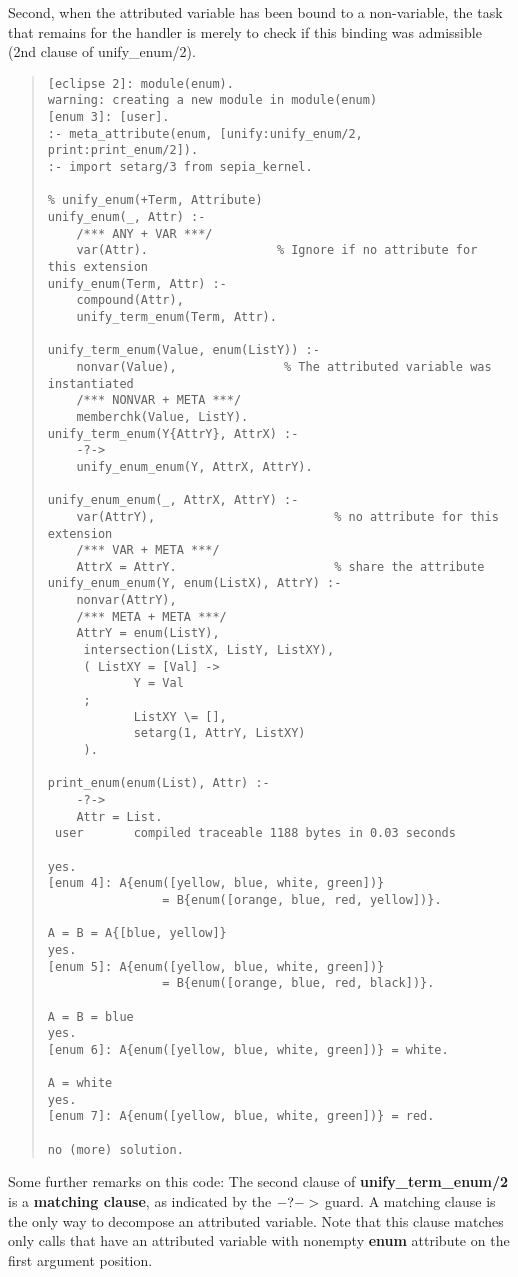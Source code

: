 Second, when the attributed variable has been bound to a non-variable, the
task that remains for the handler is merely to check if this binding
was admissible (2nd clause of unify_enum/2).

\begin{quote}\begin{verbatim}
[eclipse 2]: module(enum).
warning: creating a new module in module(enum)
[enum 3]: [user].
:- meta_attribute(enum, [unify:unify_enum/2, print:print_enum/2]).
:- import setarg/3 from sepia_kernel.

% unify_enum(+Term, Attribute)
unify_enum(_, Attr) :-
    /*** ANY + VAR ***/
    var(Attr).                  % Ignore if no attribute for this extension
unify_enum(Term, Attr) :-
    compound(Attr),
    unify_term_enum(Term, Attr).

unify_term_enum(Value, enum(ListY)) :-
    nonvar(Value),               % The attributed variable was instantiated
    /*** NONVAR + META ***/
    memberchk(Value, ListY).
unify_term_enum(Y{AttrY}, AttrX) :-
    -?->
    unify_enum_enum(Y, AttrX, AttrY).

unify_enum_enum(_, AttrX, AttrY) :-
    var(AttrY),                         % no attribute for this extension
    /*** VAR + META ***/
    AttrX = AttrY.                      % share the attribute
unify_enum_enum(Y, enum(ListX), AttrY) :-
    nonvar(AttrY),
    /*** META + META ***/
    AttrY = enum(ListY),
     intersection(ListX, ListY, ListXY),
     ( ListXY = [Val] ->
            Y = Val
     ;   
            ListXY \= [],
            setarg(1, AttrY, ListXY)
     ).  

print_enum(enum(List), Attr) :-
    -?->
    Attr = List.
 user       compiled traceable 1188 bytes in 0.03 seconds

yes.
[enum 4]: A{enum([yellow, blue, white, green])}
                = B{enum([orange, blue, red, yellow])}.

A = B = A{[blue, yellow]}
yes.
[enum 5]: A{enum([yellow, blue, white, green])}
                = B{enum([orange, blue, red, black])}.

A = B = blue
yes.
[enum 6]: A{enum([yellow, blue, white, green])} = white.

A = white
yes.
[enum 7]: A{enum([yellow, blue, white, green])} = red.

no (more) solution.

\end{verbatim}
\end{quote}

Some further remarks on this code:
The second clause of {\bf unify_term_enum/2}
is a {\bf matching clause}, as indicated
by the ${\bf -?->}$ guard.
A matching clause is the only way to decompose an attributed variable.
Note that this clause matches only calls that have an attributed variable
with nonempty {\bf enum} attribute on the
first argument position.



